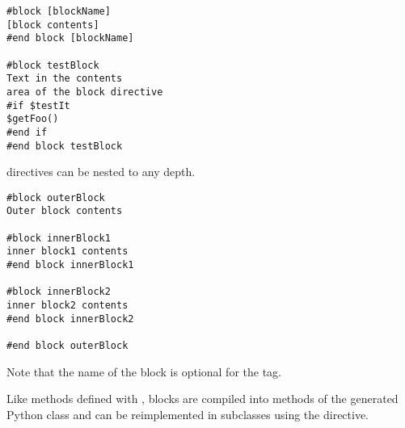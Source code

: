 \begin{verbatim}
#block [blockName] 
[block contents] 
#end block [blockName]

#block testBlock
Text in the contents 
area of the block directive
#if $testIt
$getFoo() 
#end if
#end block testBlock
\end{verbatim}

 directives can be nested to any depth.

\begin{verbatim}
#block outerBlock
Outer block contents 

#block innerBlock1
inner block1 contents 
#end block innerBlock1

#block innerBlock2
inner block2 contents 
#end block innerBlock2

#end block outerBlock
\end{verbatim}

Note that the name of the block is optional for the  tag.

Like methods defined with , blocks are compiled into methods of the
generated Python class and can be reimplemented in subclasses using the
 directive.

